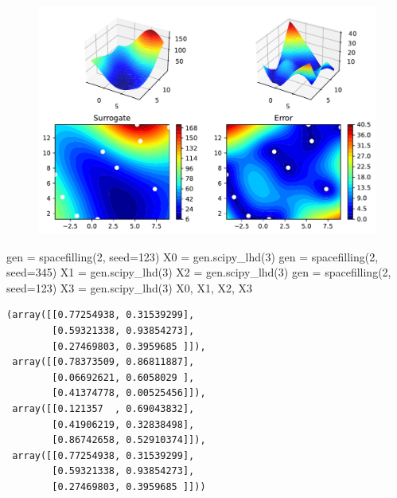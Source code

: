\documentclass[
  letterpaper,
  DIV=11,
  numbers=noendperiod]{scrreprt}
\newenvironment{Shaded}{\begin{snugshade}}{\end{snugshade}}
\newcommand{\DecValTok}[1]{\textcolor[rgb]{0.68,0.00,0.00}{#1}}
\newcommand{\NormalTok}[1]{\textcolor[rgb]{0.00,0.23,0.31}{#1}}
\newcommand{\OperatorTok}[1]{\textcolor[rgb]{0.37,0.37,0.37}{#1}}
\begin{document}
\begin{figure}[H]

{\centering \includegraphics{012_num_spot_ei_files/figure-pdf/cell-22-output-1.pdf}

}

\end{figure}

\begin{Shaded}
\begin{Highlighting}[]
\NormalTok{gen }\OperatorTok{=}\NormalTok{ spacefilling(}\DecValTok{2}\NormalTok{, seed}\OperatorTok{=}\DecValTok{123}\NormalTok{)}
\NormalTok{X0 }\OperatorTok{=}\NormalTok{ gen.scipy\_lhd(}\DecValTok{3}\NormalTok{)}
\NormalTok{gen }\OperatorTok{=}\NormalTok{ spacefilling(}\DecValTok{2}\NormalTok{, seed}\OperatorTok{=}\DecValTok{345}\NormalTok{)}
\NormalTok{X1 }\OperatorTok{=}\NormalTok{ gen.scipy\_lhd(}\DecValTok{3}\NormalTok{)}
\NormalTok{X2 }\OperatorTok{=}\NormalTok{ gen.scipy\_lhd(}\DecValTok{3}\NormalTok{)}
\NormalTok{gen }\OperatorTok{=}\NormalTok{ spacefilling(}\DecValTok{2}\NormalTok{, seed}\OperatorTok{=}\DecValTok{123}\NormalTok{)}
\NormalTok{X3 }\OperatorTok{=}\NormalTok{ gen.scipy\_lhd(}\DecValTok{3}\NormalTok{)}
\NormalTok{X0, X1, X2, X3}
\end{Highlighting}
\end{Shaded}

\begin{verbatim}
(array([[0.77254938, 0.31539299],
        [0.59321338, 0.93854273],
        [0.27469803, 0.3959685 ]]),
 array([[0.78373509, 0.86811887],
        [0.06692621, 0.6058029 ],
        [0.41374778, 0.00525456]]),
 array([[0.121357  , 0.69043832],
        [0.41906219, 0.32838498],
        [0.86742658, 0.52910374]]),
 array([[0.77254938, 0.31539299],
        [0.59321338, 0.93854273],
        [0.27469803, 0.3959685 ]]))
\end{verbatim}
\end{document}
